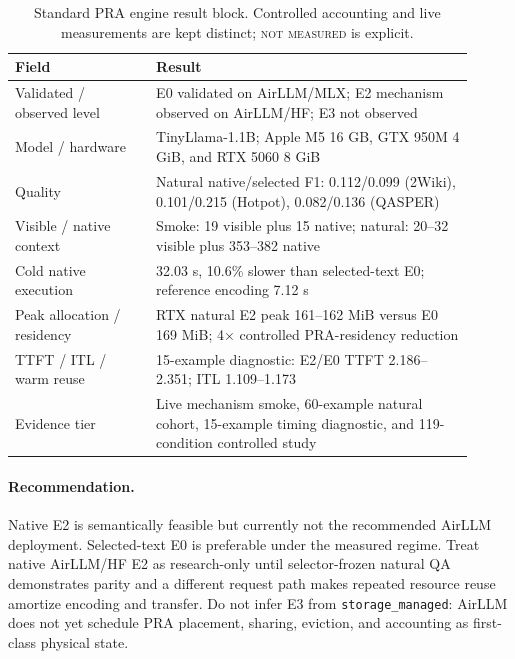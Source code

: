 \documentclass[10pt]{article}
\begin{document}
\begin{table}[ht]
\centering
\small
\caption{Standard PRA engine result block. Controlled accounting and live
measurements are kept distinct; \textsc{not measured} is explicit.}
\label{tab:airllm-qualification}
\begin{tabular}{p{0.28\linewidth}p{0.63\linewidth}}
\toprule
Field & Result \\
\midrule
Validated / observed level & E0 validated on AirLLM/MLX; E2 mechanism observed on AirLLM/HF; E3 not observed \\
Model / hardware & TinyLlama-1.1B; Apple M5 16 GB, GTX 950M 4 GiB, and RTX 5060 8 GiB \\
Quality & Natural native/selected F1: 0.112/0.099 (2Wiki), 0.101/0.215 (Hotpot), 0.082/0.136 (QASPER) \\
Visible / native context & Smoke: 19 visible plus 15 native; natural: 20--32 visible plus 353--382 native \\
Cold native execution & 32.03 s, 10.6\% slower than selected-text E0; reference encoding 7.12 s \\
Peak allocation / residency & RTX natural E2 peak 161--162 MiB versus E0 169 MiB; 4$\times$ controlled PRA-residency reduction \\
TTFT / ITL / warm reuse & 15-example diagnostic: E2/E0 TTFT 2.186--2.351; ITL 1.109--1.173 \\
Evidence tier & Live mechanism smoke, 60-example natural cohort, 15-example timing diagnostic, and 119-condition controlled study \\
\bottomrule
\end{tabular}
\end{table}

\paragraph{Recommendation.}
Native E2 is semantically feasible but currently not the recommended AirLLM
deployment. Selected-text E0 is preferable under the measured regime. Treat
native AirLLM/HF E2 as research-only until selector-frozen natural QA
demonstrates parity and a different request path makes repeated resource reuse
amortize encoding and transfer. Do not infer E3 from
\texttt{storage\_managed}: AirLLM does not yet schedule PRA placement, sharing,
eviction, and accounting as first-class physical state.
\end{document}
